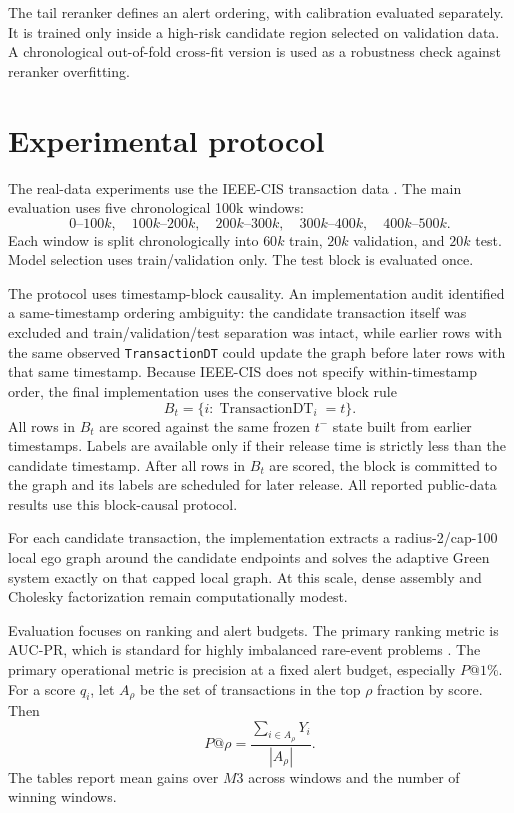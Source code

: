 \documentclass[11pt]{article}
\theoremstyle{definition}
\theoremstyle{remark}
\begin{document}
The tail reranker defines an alert ordering, with calibration evaluated separately. It is trained only inside a high-risk candidate region selected on validation data. A chronological out-of-fold cross-fit version is used as a robustness check against reranker overfitting.

\section{Experimental protocol}
\label{sec:protocol}

The real-data experiments use the IEEE-CIS transaction data \cite{ieeecis}. The main evaluation uses five chronological 100k windows:
\[
    0\text{--}100k,
    \quad 100k\text{--}200k,
    \quad 200k\text{--}300k,
    \quad 300k\text{--}400k,
    \quad 400k\text{--}500k.
\]
Each window is split chronologically into $60k$ train, $20k$ validation, and $20k$ test. Model selection uses train/validation only. The test block is evaluated once.

The protocol uses timestamp-block causality. An implementation audit identified a same-timestamp ordering ambiguity: the candidate transaction itself was excluded and train/validation/test separation was intact, while earlier rows with the same observed \texttt{TransactionDT} could update the graph before later rows with that same timestamp. Because IEEE-CIS does not specify within-timestamp order, the final implementation uses the conservative block rule
\[
    B_t=\{i:\operatorname{TransactionDT}_i=t\}.
\]
All rows in $B_t$ are scored against the same frozen $t^-$ state built from earlier timestamps. Labels are available only if their release time is strictly less than the candidate timestamp. After all rows in $B_t$ are scored, the block is committed to the graph and its labels are scheduled for later release. All reported public-data results use this block-causal protocol.

For each candidate transaction, the implementation extracts a radius-2/cap-100 local ego graph around the candidate endpoints and solves the adaptive Green system exactly on that capped local graph. At this scale, dense assembly and Cholesky factorization remain computationally modest.

Evaluation focuses on ranking and alert budgets. The primary ranking metric is AUC-PR, which is standard for highly imbalanced rare-event problems \cite{davis2006relationship,saito2015precision}. The primary operational metric is precision at a fixed alert budget, especially $P@1\%$. For a score $q_i$, let $A_\rho$ be the set of transactions in the top $\rho$ fraction by score. Then
\[
    P@\rho=\frac{\sum_{i\in A_\rho}Y_i}{|A_\rho|}.
\]
The tables report mean gains over $M3$ across windows and the number of winning windows.
\end{document}
